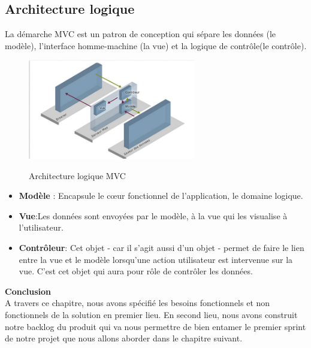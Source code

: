 \subsection{Architecture logique}
La démarche MVC est un patron de conception qui sépare les données (le modèle), l’interface 
homme-machine (la vue) et la logique de contrôle(le contrôle).

\begin{figure}[!h]
	\centering
	{\includegraphics[width=0.65\textwidth]{D) IMAGES/MVC.png}}
	\caption{Architecture logique MVC}
	\label{Diagramme3}
\end{figure}

\begin{itemize}
	\item \textbf{Modèle} : Encapsule le cœur fonctionnel de l’application, le domaine logique.
	\item \textbf{Vue}:Les données sont envoyées par le modèle, à la vue qui les visualise à l’utilisateur.
	\item \textbf{Contrôleur}: Cet objet - car il s'agit aussi d'un objet - permet de faire le lien entre la vue et 
	le modèle lorsqu'une action utilisateur est intervenue sur la vue. C'est cet objet qui aura pour 
	rôle de contrôler les données.
	

\end{itemize}

\textbf{Conclusion}\\
A travers ce chapitre, nous avons spécifié les besoins fonctionnels et non fonctionnels de la solution en premier lieu. En second lieu, nous avons construit notre backlog du produit qui va nous permettre de bien entamer le premier sprint de notre projet que nous allons aborder dans le chapitre suivant.
